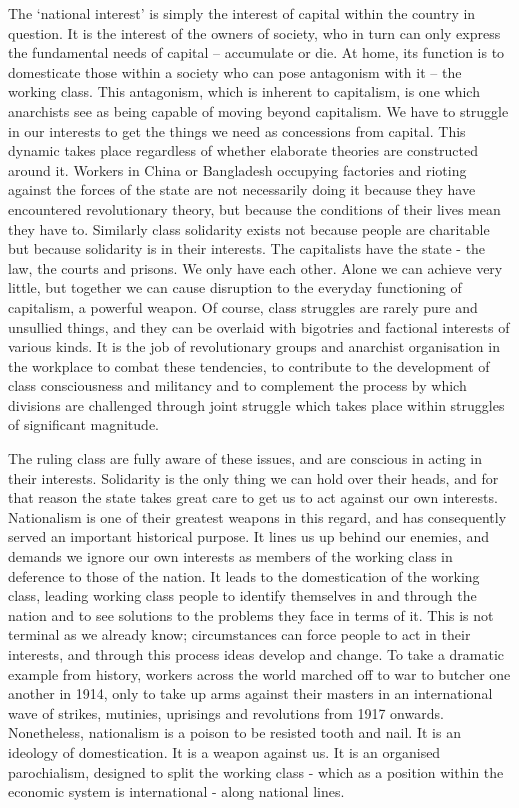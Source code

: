 The ‘national interest’ is simply the interest of capital within the country in question.
It is the interest of the owners of society, who in turn can only express the fundamental needs of capital – accumulate or die.
At home, its function is to domesticate those within a society who can pose antagonism with it – the working class.
This antagonism, which is inherent to capitalism, is one which anarchists see as being capable of moving beyond capitalism.
We have to struggle in our interests to get the things we need as concessions from capital.
This dynamic takes place regardless of whether elaborate theories are constructed around it.
Workers in China or Bangladesh occupying factories and rioting against the forces of the state are not necessarily doing it because they have encountered revolutionary theory, but because the conditions of their lives mean they have to.
Similarly class solidarity exists not because people are charitable but because solidarity is in their interests.
The capitalists have the state - the law, the courts and prisons.
We only have each other.
Alone we can achieve very little, but together we can cause disruption to the everyday functioning of capitalism, a powerful weapon.
Of course, class struggles are rarely pure and unsullied things, and they can be overlaid with bigotries and factional interests of various kinds.
It is the job of revolutionary groups and anarchist organisation in the workplace to combat these tendencies, to contribute to the development of class consciousness and militancy and to complement the process by which divisions are challenged through joint struggle which takes place within struggles of significant magnitude.

The ruling class are fully aware of these issues, and are conscious in acting in their interests.
Solidarity is the only thing we can hold over their heads, and for that reason the state takes great care to get us to act against our own interests.
Nationalism is one of their greatest weapons in this regard, and has consequently served an important historical purpose.
It lines us up behind our enemies, and demands we ignore our own interests as members of the working class in deference to those of the nation.
It leads to the domestication of the working class, leading working class people to identify themselves in and through the nation and to see solutions to the problems they face in terms of it.
This is not terminal as we already know; circumstances can force people to act in their interests, and through this process ideas develop and change.
To take a dramatic example from history, workers across the world marched off to war to butcher one another in 1914, only to take up arms against their masters in an international wave of strikes, mutinies, uprisings and revolutions from 1917 onwards.
Nonetheless, nationalism is a poison to be resisted tooth and nail.
It is an ideology of domestication.
It is a weapon against us.
It is an organised parochialism, designed to split the working class - which as a position within the economic system is international - along national lines.

